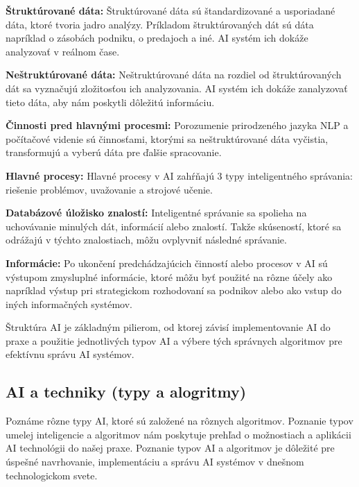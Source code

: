 \par \textbf{Štruktúrované dáta:} Štruktúrované dáta sú štandardizované a usporiadané dáta, ktoré tvoria jadro analýzy.  Príkladom štruktúrovaných dát sú dáta napríklad o zásobách podniku, o predajoch a iné. AI systém ich dokáže analyzovať v reálnom čase. \cite{paschen2020}
\\
\par \textbf{Neštruktúrované dáta:} Neštruktúrované dáta na rozdiel od štruktúrovaných dát sa vyznačujú zložitosťou ich analyzovania. AI systém ich dokáže zanalyzovať tieto dáta, aby nám poskytli dôležitú informáciu. 
\\
\par \textbf{Činnosti pred hlavnými procesmi:} Porozumenie prirodzeného jazyka NLP a počítačové videnie sú činnosťami, ktorými sa neštruktúrované dáta vyčistia, transformujú a vyberú dáta pre ďalšie spracovanie. \cite{paschen2020}
\\
\par \textbf{Hlavné procesy:} Hlavné procesy v AI zahŕňajú 3 typy inteligentného správania: riešenie problémov, uvažovanie a strojové učenie. \cite{paschen2020}
\\
\par \textbf{Databázové úložisko znalostí:} Inteligentné správanie sa spolieha na uchovávanie minulých dát, informácií alebo znalostí. Takže skúseností, ktoré sa odrážajú v týchto znalostiach, môžu ovplyvniť následné správanie. \cite{paschen2020}
\\
\par \textbf{Informácie:} Po ukončení predchádzajúcich činností alebo procesov v AI sú výstupom zmysluplné informácie, ktoré môžu byť použité na rôzne účely ako napríklad výstup pri strategickom rozhodovaní sa podnikov alebo ako vstup do iných informačných systémov. \cite{paschen2020}
\par Štruktúra AI je základným pilierom, od ktorej závisí implementovanie AI do praxe a použitie jednotlivých typov AI a výbere tých správnych algoritmov pre efektívnu správu AI systémov. 




\subsection{AI a techniky (typy a alogritmy)}

Poznáme rôzne typy AI, ktoré sú založené na rôznych algoritmov. Poznanie typov umelej inteligencie a algoritmov nám poskytuje prehľad o možnostiach a aplikácii AI technológii do našej praxe. Poznanie typov AI a algoritmov je dôležité pre úspešné navrhovanie, implementáciu a správu AI systémov v dnešnom technologickom svete.


